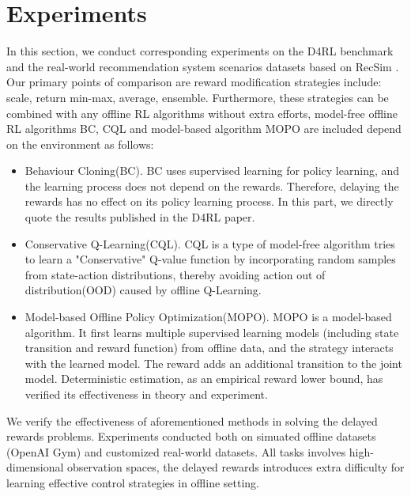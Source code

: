 \section{Experiments}

In this section, we conduct corresponding experiments on the D4RL benchmark \cite{fuD4RLDatasetsDeep2021} and the real-world recommendation system scenarios datasets based on RecSim \cite{ieRecSimConfigurableSimulation2019}. Our primary points of comparison are reward modification strategies include: scale, return min-max, average, ensemble. Furthermore, these strategies can be combined with any offline RL algorithms without extra efforts, model-free offline RL algorithms BC, CQL \cite{kumarConservativeQLearningOffline2020} and model-based algorithm MOPO \cite{yuMOPOModelbasedOffline2020} are included depend on the environment as follows:

\begin{itemize}
    \item Behaviour Cloning(BC). BC uses supervised learning for policy learning, and the learning process does not depend on the rewards. Therefore, delaying the rewards has no effect on its policy learning process. In this part, we directly quote the results published in the D4RL paper.

    \item Conservative Q-Learning(CQL). CQL is a type of model-free algorithm  tries to learn a "Conservative" Q-value function by incorporating random samples from state-action distributions, thereby avoiding action out of distribution(OOD) caused by offline Q-Learning.

    \item Model-based Offline Policy Optimization(MOPO). MOPO is a model-based algorithm. It first learns multiple supervised learning models (including state transition and reward function) from offline data, and the strategy interacts with the learned model. The reward adds an additional transition to the joint model. Deterministic estimation, as an empirical reward lower bound, has verified its effectiveness in theory and experiment.

\end{itemize}

We verify the effectiveness of aforementioned methods in solving the delayed rewards problems. Experiments conducted both on simuated offline datasets (OpenAI Gym) and customized real-world datasets. All tasks involves  high-dimensional observation spaces, the delayed rewards introduces extra difficulty for learning effective control strategies in offline setting.

